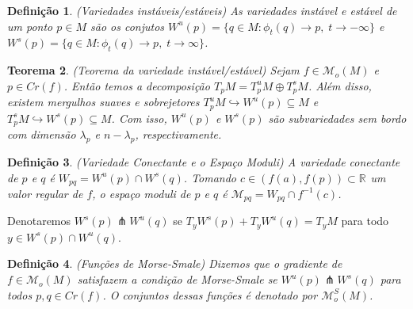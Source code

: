 \documentclass{beamer}
\newtheorem{teorema}{Teorema}[section]
\newtheorem{definicao}[teorema]{Definição}
\newcommand{\espacomoduli}[2]{\mathcal{M}_{#1#2}}
\newcommand{\espacotangentevariedadeestavel}{T^{s}_{p}M}
\newcommand{\espacotangentevariedadeinstavel}{T^{u}_{p}M}
\newcommand{\espacotangenteponto}[2]{T_{#1}#2}
\newcommand{\espacotangentevariedade}{\espacotangenteponto{p}{M}}
\newcommand{\funcoesmorse}[1]{\mathcal{M}_{o}(#1)}
\newcommand{\funcoesmorsesmale}[1]{\mathcal{M}^{S}_{o}(#1)}
\newcommand{\pontoscriticos}[1]{\textit{Cr}(#1)}
\newcommand{\real}[1]{\mathbb{R}^{#1}}
\newcommand{\reta}{\real{}}
\newcommand{\variedadeconectantepontos}[2]{W_{#1#2}}
\newcommand{\variedadeestavel}[1]{W^{s}(#1)}
\newcommand{\variedadeinstavel}[1]{W^{u}(#1)}
\begin{document}
\begin{frame}
	\begin{definicao}
		(Variedades instáveis/estáveis)  As variedades instável e estável de um ponto $p \in M$ são os conjutos $\variedadeinstavel{p} = \{q\in M: \phi_{t}(q) \to p,\; t\to -\infty\}$ e $\variedadeestavel{p} = \{q\in M: \phi_{t}(q) \to p,\; t\to \infty\}$.
	\end{definicao}
	\begin{teorema}
		(Teorema da variedade instável/estável) Sejam $f \in \funcoesmorse{M}$ e $p \in \pontoscriticos{f}$. Então temos a decomposição $\espacotangentevariedade=\espacotangentevariedadeinstavel\oplus\espacotangentevariedadeestavel$. Além disso, existem mergulhos suaves e sobrejetores $\espacotangentevariedadeinstavel \hookrightarrow \variedadeinstavel{p} \subseteq M$ e $\espacotangentevariedadeestavel \hookrightarrow \variedadeestavel{p} \subseteq M$. Com isso, $\variedadeinstavel{p}$ e $\variedadeestavel{p}$ são subvariedades sem bordo com dimensão $\lambda_{p}$ e $n-\lambda_{p}$, respectivamente.
	\end{teorema}
	
\end{frame}

\begin{frame}
	
	\begin{definicao}
		(Variedade Conectante e o Espaço Moduli) A variedade conectante de $p$ e $q$ é $\variedadeconectantepontos{p}{q} = \variedadeinstavel{p}\cap \variedadeestavel{q}$. Tomando $c \in (f(a), f(p)) \subset \reta$ um valor regular de $f$, o espaço moduli de $p$ e $q$ é $\espacomoduli{p}{q} = \variedadeconectantepontos{p}{q}\cap f^{-1}(c)$.
	\end{definicao}
	
	Denotaremos $\variedadeestavel{p}\pitchfork \variedadeinstavel{q}$ se $\espacotangenteponto{y}{\variedadeestavel{p}} + \espacotangenteponto{y}{\variedadeinstavel{q}} = \espacotangenteponto{y}{M}$ para todo $y \in \variedadeestavel{p}\cap\variedadeinstavel{q}$.
	\begin{definicao}
		(Funções de Morse-Smale) Dizemos que o gradiente de $f \in \funcoesmorse{M}$ satisfazem a condição de Morse-Smale se $\variedadeinstavel{p}\pitchfork \variedadeestavel{q}$ para todos $p,q \in \pontoscriticos{f}$. O conjuntos dessas funções é denotado por $\funcoesmorsesmale{M}$.
	\end{definicao}
	
\end{frame}
\end{document}
